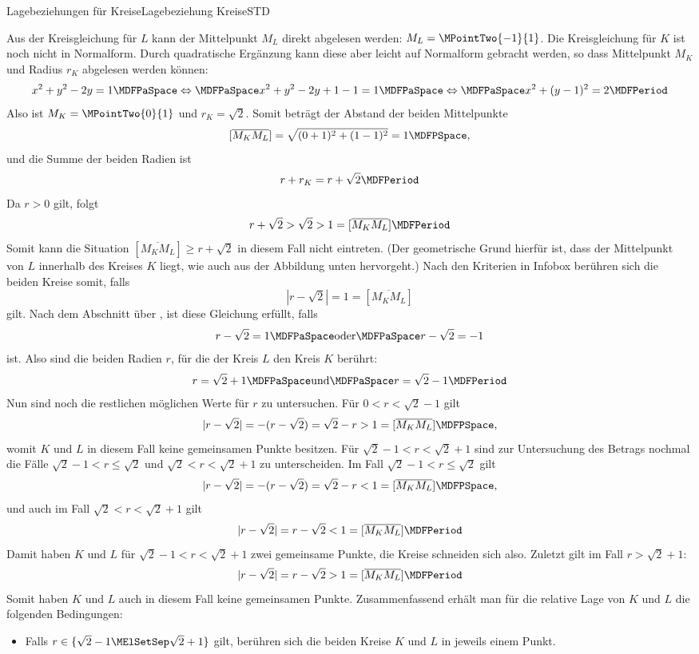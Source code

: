 \begin{MXContent}{Lagebeziehungen für Kreise}{Lagebeziehung Kreise}{STD}
\begin{MExample}
Aus der Kreisgleichung für $L$ kann der Mittelpunkt $M_L$ direkt abgelesen werden: $M_L=\MPointTwo{-1}{1}$. Die Kreisgleichung für $K$ ist noch nicht in Normalform. Durch quadratische Ergänzung kann diese aber leicht auf Normalform gebracht werden, so dass Mittelpunkt $M_K$ und Radius $r_K$ abgelesen werden können:
\[
 x^2+y^2-2y=1\MDFPaSpace\Leftrightarrow\MDFPaSpace x^2+y^2-2y+1-1=1\MDFPaSpace\Leftrightarrow\MDFPaSpace x^2+(y-1)^2=2\MDFPeriod
\]
Also ist $M_K=\MPointTwo{0}{1}$ und $r_K=\sqrt{2}$. Somit beträgt der Abstand der beiden Mittelpunkte
\[
 [\overline{M_K M_L}]=\sqrt{(0+1)^2+(1-1)^2}=1 \MDFPSpace ,
\]
und die Summe der beiden Radien ist
\[
 r+r_K=r+\sqrt{2} \MDFPeriod
\]
Da $r>0$ gilt, folgt
\[
 r+\sqrt{2}>\sqrt{2}>1=[\overline{M_K M_L}] \MDFPeriod
\]
Somit kann die Situation $[\overline{M_K M_L}]\geq r+\sqrt{2}$ in diesem Fall nicht eintreten. (Der geometrische Grund hierfür ist, dass der Mittelpunkt von $L$ innerhalb des Kreises $K$ liegt, wie auch aus der Abbildung unten hervorgeht.) Nach den Kriterien in Infobox  berühren sich die beiden Kreise somit, falls
\[
 |r-\sqrt{2}|=1=[\overline{M_K M_L}]
\]
gilt. Nach dem Abschnitt über , ist diese Gleichung erfüllt, falls 
\[
 r-\sqrt{2}=1\MDFPaSpace\textrm{oder}\MDFPaSpace r-\sqrt{2}=-1
\]
ist. Also sind die beiden Radien $r$, für die der Kreis $L$ den Kreis $K$ berührt:
\[
 r=\sqrt{2}+1\MDFPaSpace\textrm{und}\MDFPaSpace r=\sqrt{2}-1\MDFPeriod
\]
Nun sind noch die restlichen möglichen Werte für $r$ zu untersuchen. Für $0<r<\sqrt{2}-1$ gilt
\[
 |r-\sqrt{2}|=-(r-\sqrt{2})=\sqrt{2}-r>1=[\overline{M_K M_L}] \MDFPSpace ,
\]
womit $K$ und $L$ in diesem Fall keine gemeinsamen Punkte besitzen. Für $\sqrt{2}-1<r<\sqrt{2}+1$ sind zur Untersuchung des Betrags nochmal die Fälle $\sqrt{2}-1<r\leq\sqrt{2}$ und $\sqrt{2}<r<\sqrt{2}+1$ zu unterscheiden. Im Fall $\sqrt{2}-1<r\leq\sqrt{2}$ gilt
\[
 |r-\sqrt{2}|=-(r-\sqrt{2})=\sqrt{2}-r<1=[\overline{M_K M_L}] \MDFPSpace ,
\]
und auch im Fall $\sqrt{2}<r<\sqrt{2}+1$ gilt
\[
 |r-\sqrt{2}|=r-\sqrt{2}<1=[\overline{M_K M_L}] \MDFPeriod
\]
Damit haben $K$ und $L$ für $\sqrt{2}-1<r<\sqrt{2}+1$ zwei gemeinsame Punkte, die Kreise schneiden sich also. Zuletzt gilt im Fall $r>\sqrt{2}+1$:
\[
 |r-\sqrt{2}|=r-\sqrt{2}>1=[\overline{M_K M_L}]\MDFPeriod
\]
Somit haben $K$ und $L$ auch in diesem Fall keine gemeinsamen Punkte. Zusammenfassend erhält man für die relative Lage von $K$ und $L$ die folgenden Bedingungen:
\begin{itemize}
 \item Falls $r\in\{\sqrt{2}-1\MElSetSep\sqrt{2}+1\}$ gilt, berühren sich die beiden Kreise $K$ und $L$ in jeweils einem Punkt.

\end{itemize}
\end{MExample}
\end{MXContent}
